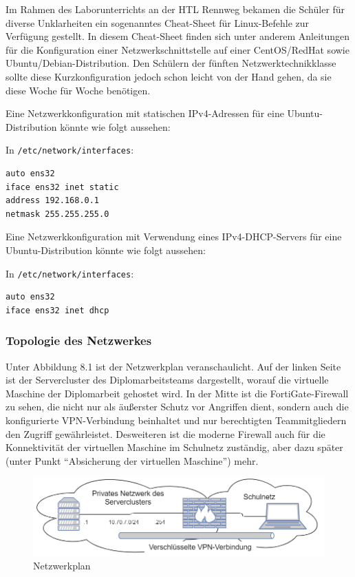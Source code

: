 \documentclass[
]{article}
\begin{document}
Im Rahmen des Laborunterrichts an der HTL Rennweg bekamen die Schüler
für diverse Unklarheiten ein sogenanntes Cheat-Sheet \cite{cheat} für
Linux-Befehle zur Verfügung gestellt. In diesem Cheat-Sheet finden sich
unter anderem Anleitungen für die Konfiguration einer
Netzwerkschnittstelle auf einer CentOS/RedHat sowie
Ubuntu/Debian-Distribution. Den Schülern der fünften
Netzwerktechnikklasse sollte diese Kurzkonfiguration jedoch schon leicht
von der Hand gehen, da sie diese Woche für Woche benötigen.

Eine Netzwerkkonfiguration mit statischen IPv4-Adressen für eine
Ubuntu-Distribution könnte wie folgt aussehen:

In \texttt{/etc/network/interfaces}:

\begin{verbatim}
auto ens32
iface ens32 inet static
address 192.168.0.1
netmask 255.255.255.0
\end{verbatim}

Eine Netzwerkkonfiguration mit Verwendung eines IPv4-DHCP-Servers für
eine Ubuntu-Distribution könnte wie folgt aussehen:

In \texttt{/etc/network/interfaces}:

\begin{verbatim}
auto ens32
iface ens32 inet dhcp
\end{verbatim}

\hypertarget{topologie-des-netzwerkes}{%
\subsubsection{Topologie des
Netzwerkes}\label{topologie-des-netzwerkes}}

Unter Abbildung 8.1 ist der Netzwerkplan veranschaulicht. Auf der linken
Seite ist der Servercluster des Diplomarbeitsteams dargestellt, worauf
die virtuelle Maschine der Diplomarbeit gehostet wird. In der Mitte ist
die FortiGate-Firewall zu sehen, die nicht nur als äußerster Schutz vor
Angriffen dient, sondern auch die konfigurierte VPN-Verbindung
beinhaltet und nur berechtigten Teammitgliedern den Zugriff
gewährleistet. Desweiteren ist die moderne Firewall auch für die
Konnektivität der virtuellen Maschine im Schulnetz zuständig, aber dazu
später (unter Punkt ``Absicherung der virtuellen Maschine'') mehr.

\begin{figure}[ht]
\centering
\includegraphics{topo1.png}
\caption{Netzwerkplan}
\end{figure}
\end{document}
